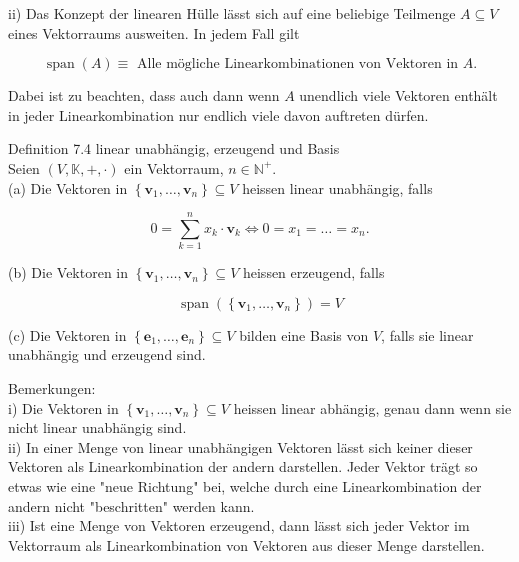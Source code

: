\documentclass[10pt]{article}
\begin{document}
ii) Das Konzept der linearen Hülle lässt sich auf eine beliebige Teilmenge $A \subseteq V$ eines Vektorraums ausweiten. In jedem Fall gilt


\begin{equation*}
\operatorname{span}(A) \equiv \text { Alle mögliche Linearkombinationen von Vektoren in } A . \tag{7.13}
\end{equation*}


Dabei ist zu beachten, dass auch dann wenn $A$ unendlich viele Vektoren enthält in jeder Linearkombination nur endlich viele davon auftreten dürfen.

Definition 7.4 linear unabhängig, erzeugend und Basis\\
Seien $(V, \mathbb{K},+, \cdot)$ ein Vektorraum, $n \in \mathbb{N}^{+}$.\\
(a) Die Vektoren in $\left\{\mathbf{v}_{1}, \ldots, \mathbf{v}_{n}\right\} \subseteq V$ heissen linear unabhängig, falls


\begin{equation*}
0=\sum_{k=1}^{n} x_{k} \cdot \mathbf{v}_{k} \Leftrightarrow 0=x_{1}=\ldots=x_{n} . \tag{7.14}
\end{equation*}


(b) Die Vektoren in $\left\{\mathbf{v}_{1}, \ldots, \mathbf{v}_{n}\right\} \subseteq V$ heissen erzeugend, falls


\begin{equation*}
\operatorname{span}\left(\left\{\mathbf{v}_{1}, \ldots, \mathbf{v}_{n}\right\}\right)=V \tag{7.15}
\end{equation*}


(c) Die Vektoren in $\left\{\mathbf{e}_{1}, \ldots, \mathbf{e}_{n}\right\} \subseteq V$ bilden eine Basis von $V$, falls sie linear unabhängig und erzeugend sind.

Bemerkungen:\\
i) Die Vektoren in $\left\{\mathbf{v}_{1}, \ldots, \mathbf{v}_{n}\right\} \subseteq V$ heissen linear abhängig, genau dann wenn sie nicht linear unabhängig sind.\\
ii) In einer Menge von linear unabhängigen Vektoren lässt sich keiner dieser Vektoren als Linearkombination der andern darstellen. Jeder Vektor trägt so etwas wie eine "neue Richtung" bei, welche durch eine Linearkombination der andern nicht "beschritten" werden kann.\\
iii) Ist eine Menge von Vektoren erzeugend, dann lässt sich jeder Vektor im Vektorraum als Linearkombination von Vektoren aus dieser Menge darstellen.
\end{document}
